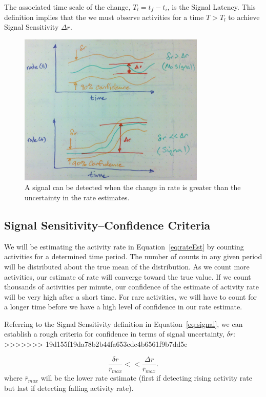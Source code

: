 \documentclass{article}
\begin{document}
The associated time scale of the change, $T_l = t_f - t_i$, is the Signal Latency.  This definition implies that the we must observe activities for a time $T > T_l$ to achieve Signal Sensitivity $\Delta r$.

%
\begin{figure}[h]
    \centering
    \includegraphics[width=3.5in]{./imgs/signal.jpg}
        \caption{A signal can be detected when the change in rate is greater than the uncertainty in the rate estimates.}
    \label{fig:signal}
\end{figure}
%
%

\subsection{Signal Sensitivity--Confidence Criteria} 

We will be estimating the activity rate in Equation~\ref{eq:rateEst} by counting activities for a determined time period.  The number of counts in any given period will be distributed about the true mean of the distribution. As we count more activities, our estimate of rate will converge toward the true value.  If we count thousands of activities per minute, our confidence of the estimate of activity rate will be very high after a short time.  For rare activities, we will have to count for a longer time before we have a high level of confidence in our rate estimate.


Referring to the Signal Sensitivity definition in Equation~\ref{eq:signal}, we can establish a rough criteria for confidence in terms of signal uncertainty, $\delta r$: 
>>>>>>> 19d155f19da78b2b44fa653cdc4b6561f9b7dd5e

\begin{equation}
    \label{eq:criteria}
    \frac{\delta r}{\bar{r}_{max}} << \frac{\Delta r}{\bar{r}_{max}}.
\end{equation}
where $\bar{r}_{max}$ will be the lower rate estimate (first if detecting rising activity rate but last if detecting falling activity rate).
\end{document}
